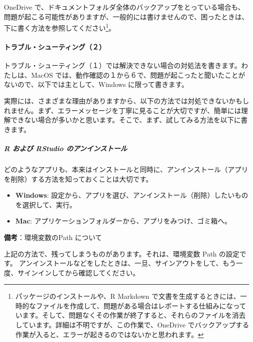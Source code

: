 \documentclass[
]{bxjsbook}
\providecommand{\tightlist}{%
  \setlength{\itemsep}{0pt}\setlength{\parskip}{0pt}}
\theoremstyle{definition}
\theoremstyle{definition}
\theoremstyle{definition}
\theoremstyle{definition}
\theoremstyle{remark}
\begin{document}
OneDrive で、ドキュメントフォルダ全体のバックアップをとっている場合も、問題が起こる可能性がありますが、一般的には書けませんので、困ったときは、下に書く方法を参照してください\footnote{パッケージのインストールや、R Markdown で文書を生成するときには、一時的なファイルを作成して、問題がある場合はレポートする仕組みになっています。そして、問題なくその作業が終了すると、それらのファイルを消去しています。詳細は不明ですが、この作業で、OneDrive でバックアップする作業が入ると、エラーが起きるのではないかと思われます。}。

\hypertarget{ux30c8ux30e9ux30d6ux30ebux30b7ux30e5ux30fcux30c6ux30a3ux30f3ux30b0uxff12}{%
\paragraph{トラブル・シューティング（２）}\label{ux30c8ux30e9ux30d6ux30ebux30b7ux30e5ux30fcux30c6ux30a3ux30f3ux30b0uxff12}}

トラブル・シューティング（１）では解決できない場合の対処法を書きます。わたしは、MacOS では、動作確認の１から６で、問題が起こったと聞いたことがないので、以下では主として、Windows に限って書きます。

実際には、さまざまな理由がありますから、以下の方法では対処できないかもしれません。まず、エラーメッセージを丁寧に見ることが大切ですが、簡単には理解できない場合が多いかと思います。そこで、まず、試してみる方法を以下に書きます。

\hypertarget{r-ux304aux3088ux3073-rstudio-ux306eux30a2ux30f3ux30a4ux30f3ux30b9ux30c8ux30fcux30eb}{%
\subparagraph{R および RStudio のアンインストール}\label{r-ux304aux3088ux3073-rstudio-ux306eux30a2ux30f3ux30a4ux30f3ux30b9ux30c8ux30fcux30eb}}

どのようなアプリも、本来はインストールと同時に、アンインストール（アプリを削除）する方法を知っておくことは大切です。

\begin{itemize}
\tightlist
\item
  \textbf{Windows}: 設定から、アプリを選び、アンインストール（削除）したいものを選択して、実行。
\item
  \textbf{Mac}: アプリケーションフォルダーから、アプリをみつけ、ゴミ箱へ。
\end{itemize}

\textbf{備考}：環境変数のPath について

上記の方法で、残ってしまうものがあります。それは、環境変数 Path の設定です。
アンインストールなどをしたときは、一旦、サインアウトをして、もう一度、サインインしてから確認してください。
\end{document}
